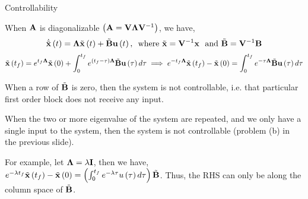 \documentclass[aspectratio=169]{beamer}
\def\mf{\ensuremath\mathbf}
\def\lp{\ensuremath\left(}
\def\rp{\ensuremath\right)}
\newcommand{\ct}[1]{\lp #1\rp}
\begin{document}
\begin{frame}{Controllability}

When $\mf{A}$ is diagonalizable $\ct{\mf{A} = \mf{V}\mf{\Lambda}\mf{V}^{-1}}$, we have,
\[ \dot{\tilde{\mf{x}}}\ct{t} = \mf{\Lambda}\tilde{\mf{x}}\ct{t} + \tilde{\mf{B}}\mf{u}\ct{t}, \,\,\,\text{where } \tilde{\mf{x}} = \mf{V}^{-1}\mf{x} \,\, \text{ and } \tilde{\mf{B}} = \mf{V}^{-1}\mf{B}\]
\[ \tilde{\mf{x}}\ct{t_f} = e^{t_f\mf{\Lambda}}\tilde{\mf{x}}\ct{0} + \int_{0}^{t_f} e^{\ct{t_f - \tau}\mf{\Lambda}}\tilde{\mf{B}}\mf{u}\ct{\tau}d\tau \implies e^{-t_f\mf{\Lambda}}\tilde{\mf{x}}\ct{t_f} - \tilde{\mf{x}}\ct{0} =  \int_{0}^{t_f} e^{-\tau\mf{\Lambda}}\tilde{\mf{B}}\mf{u}\ct{\tau}d\tau \]

When a row of $\tilde{\mf{B}}$ is zero, then the system is not controllable, i.e. that particular first order block does not receive any input.\vspace{0.2cm}

When the two or more eigenvalue of the system are repeated, and we only have a single input to the system, then the system is not controllable (problem (b) in the previous slide).

For example, let $\mf{\Lambda} = \lambda \mf{I}$, then we have, $e^{-\lambda t_f}\tilde{\mf{x}}\ct{t_f} - \tilde{\mf{x}}\ct{0} =  \ct{\int_{0}^{t_f} e^{-\lambda\tau}u\ct{\tau}d\tau}\tilde{\mf{B}}$. Thus, the RHS can only be along the column space of $\tilde{\mf{B}}$.
\end{frame}
 
\end{document}

